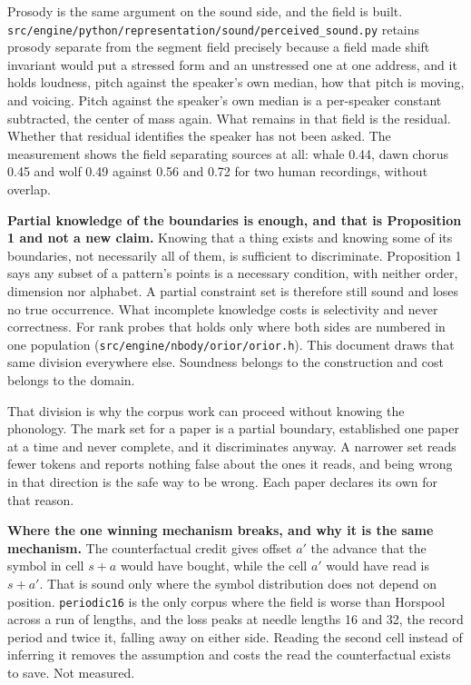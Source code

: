 Prosody is the same argument on the sound side, and the field is built. \texttt{src/\allowbreak{}engine/\allowbreak{}python/\allowbreak{}representation/\allowbreak{}sound/\allowbreak{}perceived\_\allowbreak{}sound.\allowbreak{}py} retains prosody separate from the segment field precisely because a field made shift invariant would put a stressed form and an unstressed one at one address, and it holds loudness, pitch against the speaker's own median, how that pitch is moving, and voicing. Pitch against the speaker's own median is a per-speaker constant subtracted, the center of mass again. What remains in that field is the residual. Whether that residual identifies the speaker has not been asked. The measurement shows the field separating sources at all: whale 0.44, dawn chorus 0.45 and wolf 0.49 against 0.56 and 0.72 for two human recordings, without overlap.

\textbf{Partial knowledge of the boundaries is enough, and that is Proposition 1 and not a new claim.} Knowing that a thing exists and knowing some of its boundaries, not necessarily all of them, is sufficient to discriminate. Proposition 1 says any subset of a pattern's points is a necessary condition, with neither order, dimension nor alphabet. A partial constraint set is therefore still sound and loses no true occurrence. What incomplete knowledge costs is selectivity and never correctness. For rank probes that holds only where both sides are numbered in one population (\texttt{src/\allowbreak{}engine/\allowbreak{}nbody/\allowbreak{}orior/\allowbreak{}orior.h}). This document draws that same division everywhere else. Soundness belongs to the construction and cost belongs to the domain.

That division is why the corpus work can proceed without knowing the phonology. The mark set for a paper is a partial boundary, established one paper at a time and never complete, and it discriminates anyway. A narrower set reads fewer tokens and reports nothing false about the ones it reads, and being wrong in that direction is the safe way to be wrong. Each paper declares its own for that reason.

\textbf{Where the one winning mechanism breaks, and why it is the same mechanism.} The counterfactual credit gives offset \(a'\) the advance that the symbol in cell \(s+a\) would have bought, while the cell \(a'\) would have read is \(s+a'\). That is sound only where the symbol distribution does not depend on position. \texttt{periodic16} is the only corpus where the field is worse than Horspool across a run of lengths, and the loss peaks at needle lengths 16 and 32, the record period and twice it, falling away on either side. Reading the second cell instead of inferring it removes the assumption and costs the read the counterfactual exists to save. Not measured.

